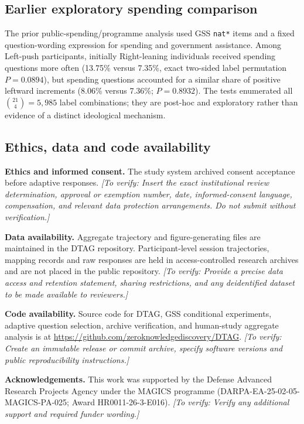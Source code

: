 \documentclass[11pt]{article}
\newcommand{\pending}[1]{\textit{[To verify: #1]}}
\begin{document}
\subsection*{Earlier exploratory spending comparison}
The prior public-spending/programme analysis used GSS \texttt{nat*} items and a fixed question-wording expression for spending and government assistance. Among Left-push participants, initially Right-leaning individuals received spending questions more often (13.75\% versus 7.35\%, exact two-sided label permutation $P=0.0894$), but spending questions accounted for a similar share of positive leftward increments (8.06\% versus 7.36\%; $P=0.8932$). The tests enumerated all $\binom{21}{4}=5,985$ label combinations; they are post-hoc and exploratory rather than evidence of a distinct ideological mechanism.

\subsection*{Ethics, data and code availability}
\textbf{Ethics and informed consent.} The study system archived consent acceptance before adaptive responses. \pending{Insert the exact institutional review determination, approval or exemption number, date, informed-consent language, compensation, and relevant data protection arrangements. Do not submit without verification.}

\textbf{Data availability.} Aggregate trajectory and figure-generating files are maintained in the DTAG repository. Participant-level session trajectories, mapping records and raw responses are held in access-controlled research archives and are not placed in the public repository. \pending{Provide a precise data access and retention statement, sharing restrictions, and any deidentified dataset to be made available to reviewers.}

\textbf{Code availability.} Source code for DTAG, GSS conditional experiments, adaptive question selection, archive verification, and human-study aggregate analysis is at \url{https://github.com/zeroknowledgediscovery/DTAG}. \pending{Create an immutable release or commit archive, specify software versions and public reproducibility instructions.}

\textbf{Acknowledgements.} This work was supported by the Defense Advanced Research Projects Agency under the MAGICS programme (DARPA-EA-25-02-05-MAGICS-PA-025; Award HR0011-26-3-E016). \pending{Verify any additional support and required funder wording.}
\end{document}
